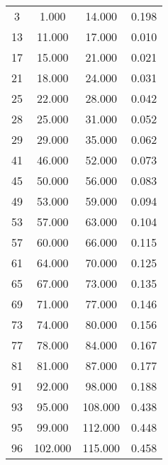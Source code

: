 % 
\begin{tabular}{cccc}
  \hline
  \hline
3 & 1.000 & 14.000 & 0.198 \\ 
  13 & 11.000 & 17.000 & 0.010 \\ 
  17 & 15.000 & 21.000 & 0.021 \\ 
  21 & 18.000 & 24.000 & 0.031 \\ 
  25 & 22.000 & 28.000 & 0.042 \\ 
  28 & 25.000 & 31.000 & 0.052 \\ 
  29 & 29.000 & 35.000 & 0.062 \\ 
  41 & 46.000 & 52.000 & 0.073 \\ 
  45 & 50.000 & 56.000 & 0.083 \\ 
  49 & 53.000 & 59.000 & 0.094 \\ 
  53 & 57.000 & 63.000 & 0.104 \\ 
  57 & 60.000 & 66.000 & 0.115 \\ 
  61 & 64.000 & 70.000 & 0.125 \\ 
  65 & 67.000 & 73.000 & 0.135 \\ 
  69 & 71.000 & 77.000 & 0.146 \\ 
  73 & 74.000 & 80.000 & 0.156 \\ 
  77 & 78.000 & 84.000 & 0.167 \\ 
  81 & 81.000 & 87.000 & 0.177 \\ 
  91 & 92.000 & 98.000 & 0.188 \\ 
  93 & 95.000 & 108.000 & 0.438 \\ 
  95 & 99.000 & 112.000 & 0.448 \\ 
  96 & 102.000 & 115.000 & 0.458 \\ 
   \hline
\end{tabular}
